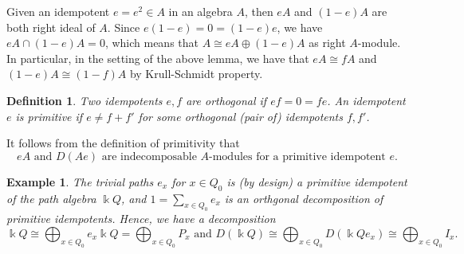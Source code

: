 \documentclass[11pt,a4paper]{article}
\numberwithin{equation}{section}
\theoremstyle{all}
\newtheorem{example}[theorem]{Example}
\newtheorem{definition}[theorem]{Definition}
\theoremstyle{remark}
\newcommand{\linA}{\vec{\mathbb{A}}}
\newcommand{\defn}[1]{\textsl{\color{darkblue} #1}}
\begin{document}
Given an idempotent $e=e^2\in A$ in an algebra $A$, then $eA$ and $(1-e)A$ are both right ideal of $A$.  Since $e(1-e)=0=(1-e)e$, we have $eA\cap (1-e)A=0$, which means that $A \cong eA\oplus (1-e)A$ as right $A$-module.  
In particular, in the setting of the above lemma, we have that $eA\cong fA$ and $(1-e)A\cong (1-f)A$ by Krull-Schmidt property.

\begin{definition}
Two idempotents $e,f$ are \defn{orthogonal} if $ef=0=fe$.
An idempotent $e$ is \defn{primitive} if $e\neq f+f'$ for some orthogonal (pair of) idempotents $f,f'$.
\end{definition}

It follows from the definition of primitivity that
\[
\text{$eA$ and $D(Ae)$ are indecomposable $A$-modules for a primitive idempotent $e$}.
\]

\begin{example}
The trivial paths $e_x$ for $x\in Q_0$ is (by design) a primitive idempotent of the path algebra $\Bbbk Q$, and $1=\sum_{x\in Q_0}e_x$ is an orthgonal decomposition of primitive idempotents.
Hence, we have a decomposition \[
\Bbbk Q\cong \bigoplus_{x\in Q_0} e_x \Bbbk Q = \bigoplus_{x\in Q_0} P_x\text{ and }D(\Bbbk Q)\cong \bigoplus_{x\in Q_0} D(\Bbbk Q e_x) \cong \bigoplus_{x\in Q_0} I_x.
\]
\end{example}

%

\end{document}
